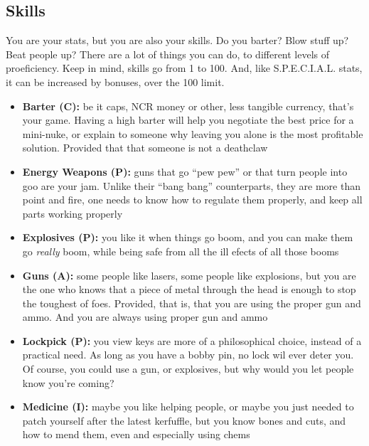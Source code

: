 \documentclass[11pt]{article} %
\begin{document}
\subsection{Skills}

You are your stats, but you are also your skills. Do you barter? Blow stuff up? Beat people up? There are a lot of things you can do, to different levels of proeficiency. Keep in mind, skills go from 1 to 100. And, like S.P.E.C.I.A.L. stats, it can be increased by bonuses, over the 100 limit.

\begin{itemize}
	\item \textbf{Barter (C):} be it caps, NCR money or other, less tangible currency, that's your game. Having a high barter will help you negotiate the best price for a mini-nuke, or explain to someone why leaving you alone is the most profitable solution. Provided that that someone is not a deathclaw
	
	\item \textbf{Energy Weapons (P):} guns that go ``pew pew'' or that turn people into goo are your jam. Unlike their ``bang bang'' counterparts, they are more than point and fire, one needs to know how to regulate them properly, and keep all parts working properly
	
	\item \textbf{Explosives (P):} you like it when things go boom, and you can make them go \textit{really} boom, while being safe from all the ill efects of all those booms
	
	\item \textbf{Guns (A):} some people like lasers, some people like explosions, but you are the one who knows that a piece of metal through the head is enough to stop the toughest of foes. Provided, that is, that you are using the proper gun and ammo. And you are always using proper gun and ammo
	
	\item \textbf{Lockpick (P):} you view keys are more of a philosophical choice, instead of a practical need. As long as you have a bobby pin, no lock wil ever deter you. Of course, you could use a gun, or explosives, but why would you let people know you're coming?
	
	\item \textbf{Medicine (I):} maybe you like helping people, or maybe you just needed to patch yourself after the latest kerfuffle, but you know bones and cuts, and how to mend them, even and especially using chems
	

\end{itemize}
\end{document}
